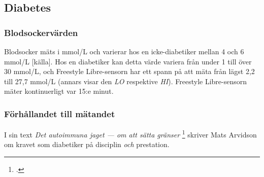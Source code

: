 \documentclass[11pt, twoside, a4paper]{article}
\begin{document}
\begin{multicols}{2}
\subsection*{Diabetes}


\subsubsection*{Blodsockervärden}
Blodsocker mäts i mmol/L och varierar hos en icke-diabetiker mellan 4 och 6 mmol/L [källa]. Hos en diabetiker kan detta värde variera från under 1 till över 30 mmol/L, och Freestyle Libre-sensorn har ett spann på att mäta från lägst 2,2 till 27,7 mmol/L (annars visar den \emph{LO} respektive \emph{HI}). Freestyle Libre-sensorn mäter kontinuerligt var 15:e minut.



\subsubsection*{Förhållandet till mätandet}
I sin text \emph{Det autoimmuna jaget --- om att sätta gränser} \footcite[286]{arvidson_det_2016} skriver Mats Arvidson om kravet som diabetiker på disciplin \emph{och} prestation.


\end{multicols}
\end{document}
